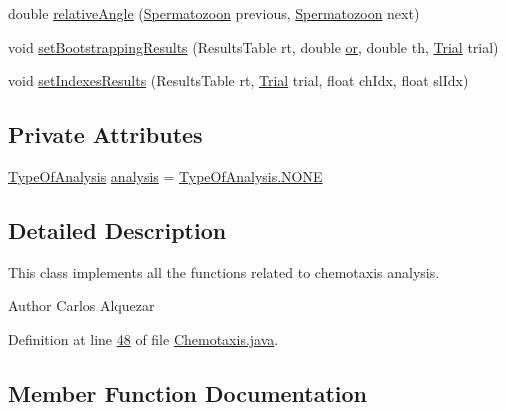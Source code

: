 \begin{DoxyCompactItemize}
\item 
double \hyperlink{classanalysis_1_1_chemotaxis_ab23f946e0f1055d348e975e3058f323d}{relative\+Angle} (\hyperlink{classdata_1_1_spermatozoon}{Spermatozoon} previous, \hyperlink{classdata_1_1_spermatozoon}{Spermatozoon} next)
\item 
void \hyperlink{classanalysis_1_1_chemotaxis_ac5db76309b6da4b0f351cdbb5876fec4}{set\+Bootstrapping\+Results} (Results\+Table rt, double \hyperlink{classanalysis_1_1_chemotaxis_a4cf45f4c73ebe44a71a622c690f0b331}{or}, double th, \hyperlink{classdata_1_1_trial}{Trial} trial)
\item 
void \hyperlink{classanalysis_1_1_chemotaxis_a9c90c33405ef04f0e75e5f8dcb56520e}{set\+Indexes\+Results} (Results\+Table rt, \hyperlink{classdata_1_1_trial}{Trial} trial, float ch\+Idx, float sl\+Idx)
\end{DoxyCompactItemize}
\subsection*{Private Attributes}
\begin{DoxyCompactItemize}
\item 
\hyperlink{enumanalysis_1_1_chemotaxis_1_1_type_of_analysis}{Type\+Of\+Analysis} \hyperlink{classanalysis_1_1_chemotaxis_ae0c6f15cfb3c589fb7817738e51998bd}{analysis} = \hyperlink{enumanalysis_1_1_chemotaxis_1_1_type_of_analysis_a899caa602e4fff675b17cdbab33607ec}{Type\+Of\+Analysis.\+N\+O\+NE}
\end{DoxyCompactItemize}


\subsection{Detailed Description}
This class implements all the functions related to chemotaxis analysis.

\begin{DoxyAuthor}{Author}
Carlos Alquezar 
\end{DoxyAuthor}


Definition at line \hyperlink{_chemotaxis_8java_source_l00048}{48} of file \hyperlink{_chemotaxis_8java_source}{Chemotaxis.\+java}.



\subsection{Member Function Documentation}
\hypertarget{classanalysis_1_1_chemotaxis_aaa89eb018d311df9e98b904088d282a5}{}\label{classanalysis_1_1_chemotaxis_aaa89eb018d311df9e98b904088d282a5} 
